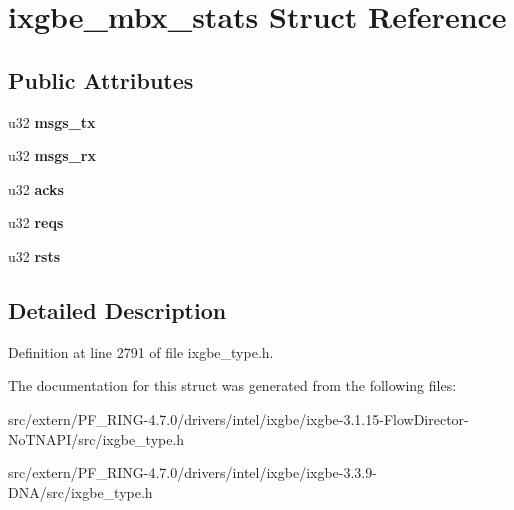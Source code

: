 \hypertarget{structixgbe__mbx__stats}{
\section{ixgbe\_\-mbx\_\-stats Struct Reference}
\label{structixgbe__mbx__stats}
}
\subsection*{Public Attributes}
\begin{DoxyCompactItemize}
\item 
\hypertarget{structixgbe__mbx__stats_a91b1c1767276c532b940deff922a932d}{
u32 {\bfseries msgs\_\-tx}}
\label{structixgbe__mbx__stats_a91b1c1767276c532b940deff922a932d}

\item 
\hypertarget{structixgbe__mbx__stats_ad79d3786210eef9f49322797a37405d1}{
u32 {\bfseries msgs\_\-rx}}
\label{structixgbe__mbx__stats_ad79d3786210eef9f49322797a37405d1}

\item 
\hypertarget{structixgbe__mbx__stats_a0278bfc654c7bc021725ed102a29933e}{
u32 {\bfseries acks}}
\label{structixgbe__mbx__stats_a0278bfc654c7bc021725ed102a29933e}

\item 
\hypertarget{structixgbe__mbx__stats_a9cceed4545f3f23f8f96cc61904c7119}{
u32 {\bfseries reqs}}
\label{structixgbe__mbx__stats_a9cceed4545f3f23f8f96cc61904c7119}

\item 
\hypertarget{structixgbe__mbx__stats_afae941849214fc4858babde2933b0ad6}{
u32 {\bfseries rsts}}
\label{structixgbe__mbx__stats_afae941849214fc4858babde2933b0ad6}

\end{DoxyCompactItemize}


\subsection{Detailed Description}


Definition at line 2791 of file ixgbe\_\-type.h.



The documentation for this struct was generated from the following files:\begin{DoxyCompactItemize}
\item 
src/extern/PF\_\-RING-\/4.7.0/drivers/intel/ixgbe/ixgbe-\/3.1.15-\/FlowDirector-\/NoTNAPI/src/ixgbe\_\-type.h\item 
src/extern/PF\_\-RING-\/4.7.0/drivers/intel/ixgbe/ixgbe-\/3.3.9-\/DNA/src/ixgbe\_\-type.h\end{DoxyCompactItemize}
